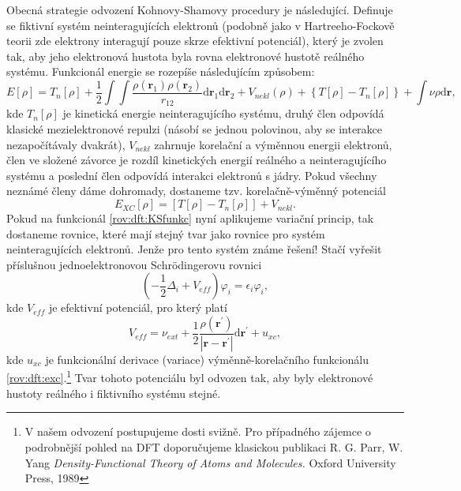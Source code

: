 Obecná strategie odvození Kohnovy-Shamovy procedury je následující. Definuje se fiktivní systém neinteragujících elektronů (podobně jako v Hartreeho-Fockově teorii zde elektrony interagují pouze skrze efektivní potenciál), který je zvolen tak, aby jeho elektronová hustota byla rovna elektronové hustotě reálného systému. 
Funkcionál energie se rozepíše následujícím způsobem:
\begin{equation}
E[\rho]= T_{n}[\rho] + \frac{1}{2}\int \int \frac{\rho(\textbf{r}_1)\rho(\textbf{r}_2)}{r_{12}}\mathrm{d}\textbf{r}_1\mathrm{d}\textbf{r}_2 + V_{nekl}(\rho) +\left\lbrace T[\rho]-T_{n}[\rho]\right\rbrace + \int \nu \rho \mathrm{d}\textbf{r},
\label{rov:dft:KSfunkc}
\end{equation}
kde $T_{n}[\rho]$ je kinetická energie neinteragujícího systému, druhý člen odpovídá klasické mezielektronové repulzi (násobí se jednou polovinou, aby se interakce nezapočítávaly dvakrát), $V_{nekl}$ zahrnuje korelační a výměnnou energii elektronů, člen ve složené závorce je rozdíl kinetických energií reálného a neinteragujícího systému  a poslední člen odpovídá interakci elektronů s jádry. Pokud všechny neznámé členy dáme dohromady, dostaneme tzv. korelačně-výměnný potenciál
\begin{equation}	
E_{XC}[\rho]=\left[T[\rho]-T_{n}[\rho]\right] +  V_{nekl} .
\label{rov:dft:exc}
\end{equation}
Pokud na funkcionál \eqref{rov:dft:KSfunkc} nyní aplikujeme variační princip, tak dostaneme rovnice, které mají stejný tvar jako rovnice
pro systém neinteragujících elektronů. Jenže pro tento systém známe řešení! Stačí vyřešit příslušnou jednoelektronovou Schr\"{o}dingerovu rovnici
\begin{equation}
\left(-\frac{1}{2}\Delta_i + V_{eff} \right) \varphi_i =\epsilon_i \varphi_i ,
\label{rov:dft:KSeq}
\end{equation}
kde $V_{eff}$ je efektivní potenciál, pro který platí
\begin{equation}
V_{eff}=\nu_{ext}+\frac{1}{2}\frac{\rho(\textbf{r}^{\prime})}{|\textbf{r}-\textbf{r}^{\prime}|}\mathrm{d}\textbf{r}^{\prime}+u_{xc} ,
\end{equation}
kde $u_{xc}$ je funkcionální derivace (variace) výměnně-korelačního funkcionálu \ref{rov:dft:exc}.\footnote{V našem odvození postupujeme dosti svižně. Pro případného zájemce o podrobnější pohled na DFT doporučujeme klasickou publikaci R. G. Parr, W. Yang \textit{Density-Functional Theory of Atoms and Molecules.} Oxford University Press, 1989} Tvar tohoto potenciálu byl odvozen tak, aby byly elektronové hustoty reálného i fiktivního systému stejné.
